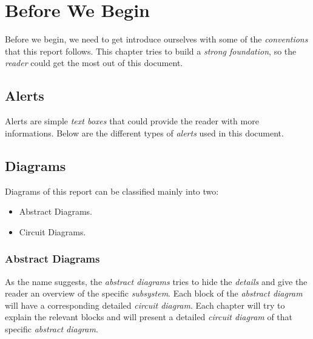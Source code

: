 \documentclass[../../main]{subfiles}
\begin{document}
\section{Before We Begin} \label{sec:}

Before we begin, we need to get introduce ourselves with some of the \emph{conventions} that this
report follows. This chapter tries to build a \emph{strong foundation}, so the \emph{reader} could
get the most out of this document.

\subsection{Alerts} \label{sec:}

Alerts are simple \emph{text boxes} that could provide the reader with more informations.
Below are the different types of \emph{alerts} used in this document.







\subsection{Diagrams} \label{sec:}

Diagrams of this report can be classified mainly into two:

\begin{itemize}

    \item Abstract Diagrams.
    \item Circuit Diagrams.

\end{itemize}

\subsubsection{Abstract Diagrams}

As the name suggests, the \emph{abstract diagrams} tries to hide the \emph{details}
and give the reader an overview of the specific \emph{subsystem}. Each block of the
\emph{abstract diagram} will have a corresponding detailed \emph{circuit diagram}.
Each chapter will try to explain the relevant blocks and will present a detailed
\emph{circuit diagram} of that specific \emph{abstract diagram}.
\end{document}
